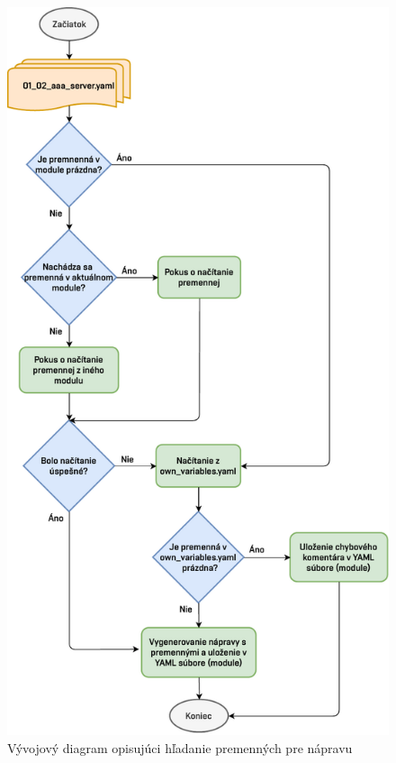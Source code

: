\begin{figure}[H]
	\begin{center}
		\vspace*{-1cm}\includegraphics[scale=0.8]{obrazky/variables_fix.pdf}
	\end{center}
	\caption[Vývojový diagram opisujúci hľadanie premenných pre nápravu]{Vývojový diagram opisujúci hľadanie premenných pre nápravu}
	\label{variables_fix}
\end{figure}


